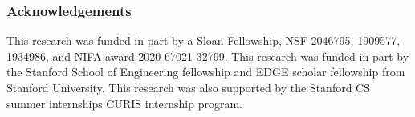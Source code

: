 
\subsubsection*{Acknowledgements}
This research was funded in part by a Sloan Fellowship, NSF 2046795, 1909577, 1934986, and NIFA award 2020-67021-32799.
This research was funded in part by the Stanford School of Engineering fellowship and EDGE scholar fellowship from Stanford University.
This research was also supported by the Stanford CS summer internships CURIS internship program.

